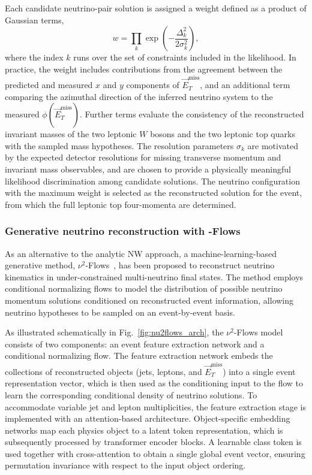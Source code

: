 Each candidate neutrino-pair solution is assigned a weight defined as a product of Gaussian terms,
%
\[
w=\prod_k \exp\!\left(-\frac{\Delta_k^2}{2\sigma_k^2}\right),
\]
%
where the index $k$ runs over the set of constraints included in the likelihood. 
In practice, the weight includes contributions from the agreement between the predicted and measured $x$ and $y$ components of $\vec{E}_T^{\mathrm{miss}}$, and an additional term comparing the azimuthal direction of the inferred neutrino system to the measured $\phi(\vec{E}_T^{\mathrm{miss}})$. 
Further terms evaluate the consistency of the reconstructed invariant masses of the two leptonic $W$ bosons and the two leptonic top quarks with the sampled mass hypotheses. 
The resolution parameters $\sigma_k$ are motivated by the expected detector resolutions for missing transverse momentum and invariant mass observables, and are chosen to provide a physically meaningful likelihood discrimination among candidate solutions.
The neutrino configuration with the maximum weight is selected as the reconstructed solution for the event, from which the full leptonic top four-momenta are determined.

\subsubsection{Generative neutrino reconstruction with \nuTwoHead{}-Flows}

As an alternative to the analytic NW approach, a machine-learning-based generative method, $\nu^2$-Flows~\cite{Raine2023nu2flows}, has been proposed to reconstruct neutrino kinematics in under-constrained multi-neutrino final states.
The method employs conditional normalizing flows to model the distribution of possible neutrino momentum solutions conditioned on reconstructed event information, allowing neutrino hypotheses to be sampled on an event-by-event basis.

As illustrated schematically in Fig.~\ref{fig:nu2flows_arch}, the $\nu^2$-Flows model consists of two components: an event feature extraction network and a conditional normalizing flow.
The feature extraction network embeds the collections of reconstructed objects (jets, leptons, and $\vec{E}_T^{\mathrm{miss}}$) into a single event representation vector, which is then used as the conditioning input to the flow to learn the corresponding conditional density of neutrino solutions.
To accommodate variable jet and lepton multiplicities, the feature extraction stage is implemented with an attention-based architecture.
Object-specific embedding networks map each physics object to a latent token representation, which is subsequently processed by transformer encoder blocks.
A learnable class token is used together with cross-attention to obtain a single global event vector, ensuring permutation invariance with respect to the input object ordering.

